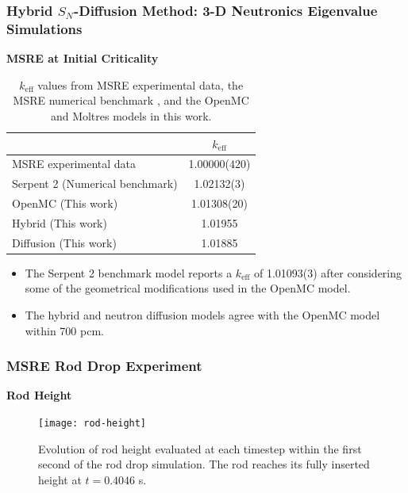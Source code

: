 \begin{frame}[noframenumbering]
  \frametitle{Hybrid $S_N$-Diffusion Method: 3-D Neutronics Eigenvalue Simulations}
  \textbf{MSRE at Initial Criticality}
  \begin{table}[htb]
    \centering
    \caption{$k_\text{eff}$ values from \gls{MSRE} experimental data, the \gls{MSRE} numerical
    benchmark \cite{fratoni_molten_2020}, and the OpenMC and Moltres models in this work.}
    \begin{tabular}{l S[table-format=1.5(2)]}
      \toprule
       & {$k_\text{eff}$} \\
       \midrule
      \gls{MSRE} experimental data & 1.00000(420) \\
      Serpent 2 (Numerical benchmark) & 1.02132(3) \\
      OpenMC (This work) & 1.01308(20) \\
      Hybrid (This work) & 1.01955 \\
      Diffusion (This work) & 1.01885 \\
      \bottomrule
    \end{tabular}
    \label{table:initial-crit}
  \end{table}

  \begin{itemize}
    \item The Serpent 2 benchmark model reports a $k_\text{eff}$ of 1.01093(3) after considering some
      of the geometrical modifications used in the OpenMC model.
    \item The hybrid and neutron diffusion models agree with the OpenMC model within 700 pcm.
  \end{itemize}
\end{frame}

\begin{frame}[noframenumbering]
  \frametitle{MSRE Rod Drop Experiment}
  \textbf{Rod Height}
  \begin{figure}[htb!]
    \centering
    \texttt{[image: rod-height]}
    \caption{Evolution of rod height evaluated at each timestep within the first second of the rod
    drop simulation. The rod reaches its fully inserted height at $t=0.4046$ s.}
    \label{fig:rod-height}
  \end{figure}
\end{frame}

